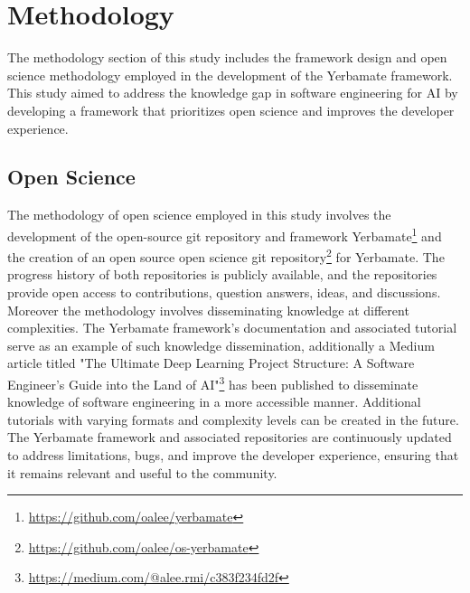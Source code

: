 


\section{Methodology}

The methodology section of this study includes the framework design and open science methodology employed in the development of the Yerbamate framework.
This study aimed to address the knowledge gap in software engineering for AI by developing a framework that prioritizes open science and improves the developer experience. 

\subsection{Open Science}

The methodology of open science employed in this study involves the development of the open-source git repository and framework Yerbamate\footnote{\url{https://github.com/oalee/yerbamate}} and the creation of an open source open science git repository\footnote{\url{https://github.com/oalee/os-yerbamate}} for Yerbamate. The progress history of both repositories is publicly available, and the repositories provide open access to contributions, question answers, ideas, and discussions. Moreover the methodology involves disseminating knowledge at different complexities. The Yerbamate framework's documentation and associated tutorial serve as an example of such knowledge dissemination, additionally
  a Medium article titled "The Ultimate Deep Learning Project Structure: A Software Engineer’s Guide into the Land of AI"\footnote{\url{https://medium.com/@alee.rmi/c383f234fd2f}} has been published to disseminate knowledge of software engineering in a more accessible manner.
 Additional tutorials with varying formats and complexity levels can be created in the future.
 The Yerbamate framework and associated repositories are continuously updated to address limitations, bugs, and improve the developer experience, ensuring that it remains relevant and useful to the community.


